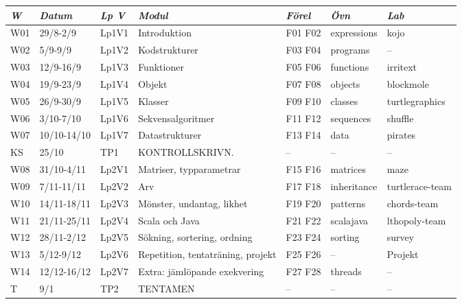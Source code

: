 \begin{tabular}{l|l|l|l|l|l|l}
\textit{W} & \textit{Datum} & \textit{Lp V} & \textit{Modul} & \textit{Förel} & \textit{Övn} & \textit{Lab} \\ \hline \hline
W01 & 29/8-2/9 & Lp1V1 & Introduktion & F01 F02 & expressions & kojo \\
W02 & 5/9-9/9 & Lp1V2 & Kodstrukturer & F03 F04 & programs & -- \\
W03 & 12/9-16/9 & Lp1V3 & Funktioner & F05 F06 & functions & irritext \\
W04 & 19/9-23/9 & Lp1V4 & Objekt & F07 F08 & objects & blockmole \\
W05 & 26/9-30/9 & Lp1V5 & Klasser & F09 F10 & classes & turtlegraphics \\
W06 & 3/10-7/10 & Lp1V6 & Sekvensalgoritmer & F11 F12 & sequences & shuffle \\
W07 & 10/10-14/10 & Lp1V7 & Datastrukturer & F13 F14 & data & pirates \\
KS & 25/10 & TP1 & KONTROLLSKRIVN. & -- & -- & -- \\
W08 & 31/10-4/11 & Lp2V1 & Matriser, typparametrar & F15 F16 & matrices & maze \\
W09 & 7/11-11/11 & Lp2V2 & Arv & F17 F18 & inheritance & turtlerace-team \\
W10 & 14/11-18/11 & Lp2V3 & Mönster, undantag, likhet & F19 F20 & patterns & chords-team \\
W11 & 21/11-25/11 & Lp2V4 & Scala och Java & F21 F22 & scalajava & lthopoly-team \\
W12 & 28/11-2/12 & Lp2V5 & Sökning, sortering, ordning & F23 F24 & sorting & survey \\
W13 & 5/12-9/12 & Lp2V6 & Repetition, tentaträning, projekt & F25 F26 & -- & Projekt \\
W14 & 12/12-16/12 & Lp2V7 & Extra: jämlöpande exekvering & F27 F28 & threads & -- \\
T & 9/1 & TP2 & TENTAMEN & -- & -- & -- \\
\end{tabular}

